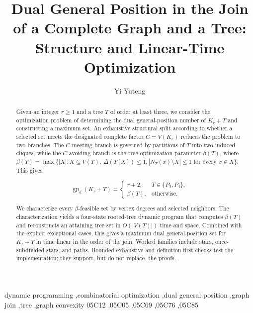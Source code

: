 \documentclass[preprint,12pt]{elsarticle}
\numberwithin{equation}{section}
\begin{document}
\begin{frontmatter}

\title{Dual General Position in the Join of a Complete Graph and a Tree:
Structure and Linear-Time Optimization}

\author[aff1]{Yi Yuteng}
\address[aff1]{Independent Researcher, Shanghai, China}

\begin{abstract}

Given an integer \(r\ge 1\) and a tree \(T\) of order at least three, we
consider the optimization problem of determining the dual general-position
number of \(K_r+T\) and constructing a maximum set. An exhaustive structural
split according to whether a selected set meets the designated complete factor
\(C=V(K_r)\) reduces the problem to two branches. The \(C\)-meeting branch is
governed by partitions of \(T\) into two induced cliques, while the
\(C\)-avoiding branch is the tree optimization parameter
\(\beta(T)\), where
\(\beta(T)=\max\{|X|:X\subseteq V(T),\ \Delta(T[X])\le 1,
|N_T(x)\setminus X|\le 1\text{ for every }x\in X\}\). This gives

\[
\operatorname{gp}_d(K_r+T)=
\begin{cases}
r+2,&T\in\{P_3,P_4\},\\
\beta(T),&\text{otherwise}.
\end{cases}
\]

We characterize every \(\beta\)-feasible set by vertex degrees and selected
neighbors. The characterization yields a four-state rooted-tree dynamic program
that computes \(\beta(T)\) and reconstructs an attaining tree set in
\(O(|V(T)|)\) time and space. Combined with the explicit exceptional cases,
this gives a maximum dual general-position set for \(K_r+T\) in time linear in
the order of the join. Worked families include stars, once-subdivided stars,
and paths. Bounded exhaustive and definition-first checks test the
implementation; they support, but do not replace, the proofs.
\end{abstract}

\begin{keyword}
dynamic programming \sep combinatorial optimization \sep dual general position
\sep graph join \sep tree \sep graph convexity
\MSC[2020] 05C12 \sep 05C05 \sep 05C69 \sep 05C76 \sep 05C85
\end{keyword}

\end{frontmatter}
\linenumbers
\end{document}

